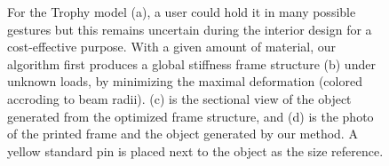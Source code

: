 \documentclass[final]{gmp2015}
\begin{document}
\begin{figure}[t]
  \caption{\label{fig:teaser}
  For the Trophy model (a), a user could hold it in many possible gestures but this remains uncertain during the interior  design for a cost-effective purpose. With a given amount of material, our algorithm first produces a global stiffness frame structure (b) under unknown loads, by minimizing the maximal deformation (colored accroding to beam radii). (c) is the sectional view of the object generated from the optimized frame structure, and (d) is the photo of the printed frame and the object generated by our method. A yellow standard pin is placed next to the object as the size reference. }
\end{figure}














\end{document}
